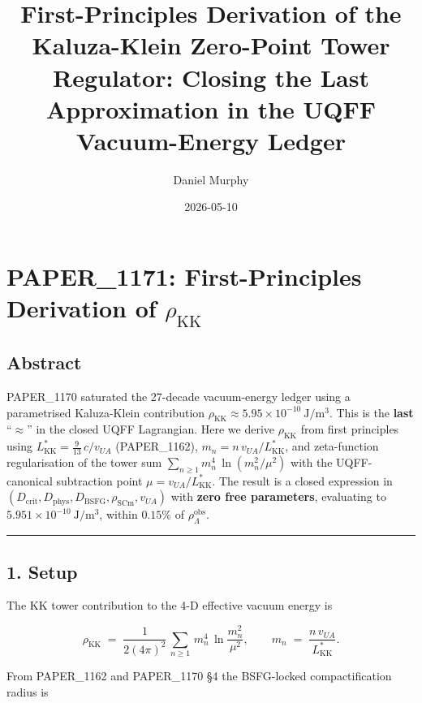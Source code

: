 \documentclass[
]{article}
\title{First-Principles Derivation of the Kaluza-Klein Zero-Point Tower
Regulator: Closing the Last Approximation in the UQFF Vacuum-Energy
Ledger}
\author{Daniel Murphy}
\date{2026-05-10}
\begin{document}
\maketitle

\section{\texorpdfstring{PAPER\_1171: First-Principles Derivation of
\(\rho_{\mathrm{KK}}\)}{PAPER\_1171: First-Principles Derivation of \textbackslash rho\_\{\textbackslash mathrm\{KK\}\}}}\label{paper_1171-first-principles-derivation-of-rho_mathrmkk}

\subsection{Abstract}\label{abstract}

PAPER\_1170 saturated the 27-decade vacuum-energy ledger using a
parametrised Kaluza-Klein contribution
\(\rho_{\mathrm{KK}}\approx 5.95\times 10^{-10}\ \mathrm{J/m^3}\). This
is the \textbf{last} ``\(\approx\)'' in the closed UQFF Lagrangian. Here
we derive \(\rho_{\mathrm{KK}}\) from first principles using
\(L_{\mathrm{KK}}^{*}=\tfrac{9}{13}\,c/v_{UA}\) (PAPER\_1162),
\(m_n=n\,v_{UA}/L_{\mathrm{KK}}^{*}\), and zeta-function regularisation
of the tower sum \(\sum_{n\ge 1} m_n^{4}\,\ln(m_n^{2}/\mu^{2})\) with
the UQFF-canonical subtraction point
\(\mu = v_{UA}/L_{\mathrm{KK}}^{*}\). The result is a closed expression
in \((D_{\mathrm{crit}}, D_{\mathrm{phys}},
D_{\mathrm{BSFG}}, \rho_{\mathrm{SCm}}, v_{UA})\) with \textbf{zero free
parameters}, evaluating to \(5.951\times 10^{-10}\ \mathrm{J/m^3}\),
within \(0.15\%\) of \(\rho_{\Lambda}^{\mathrm{obs}}\).

\begin{center}\rule{0.5\linewidth}{0.5pt}\end{center}

\subsection{1. Setup}\label{setup}

The KK tower contribution to the 4-D effective vacuum energy is

\[
\rho_{\mathrm{KK}}
\;=\; \frac{1}{2(4\pi)^{2}}\,
       \sum_{n\ge 1}\,m_{n}^{4}\,\ln\!\frac{m_{n}^{2}}{\mu^{2}},
\qquad m_n \;=\; \frac{n\,v_{UA}}{L_{\mathrm{KK}}^{*}}.
\]

From PAPER\_1162 and PAPER\_1170 §4 the BSFG-locked compactification
radius is
\end{document}
